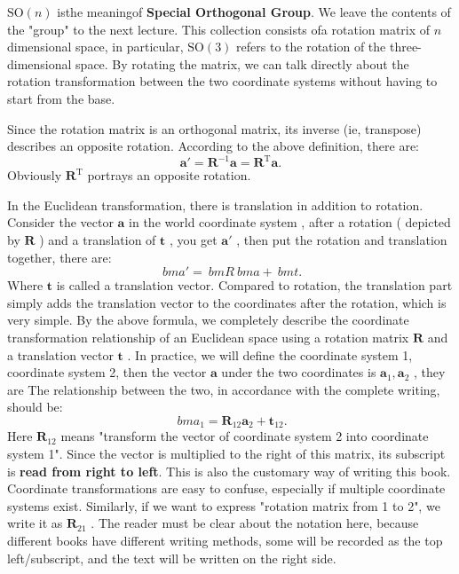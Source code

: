 $ \mathrm {SO}(n) $ isthe meaningof \textbf {Special Orthogonal Group}. We leave the contents of the "group" to the next lecture. This collection consists ofa rotation matrix of $ n $ dimensional space, in particular, $ \mathrm {SO}( 3 ) $ refers to the rotation of the three-dimensional space. By rotating the matrix, we can talk directly about the rotation transformation between the two coordinate systems without having to start from the base.

Since the rotation matrix is an orthogonal matrix, its inverse (ie, transpose) describes an opposite rotation. According to the above definition, there are:
\begin{equation}
\bm{a} '= \bm{R}^{-1} \bm{a} = \bm{R}^ \mathrm{T} \bm{a}.
\end{equation}
Obviously $ \bm{R}^\mathrm{T} $ portrays an opposite rotation.

In the Euclidean transformation, there is translation in addition to rotation. Consider the vector $ \bm{a} $ in the world coordinate system , after a rotation ( depicted by $ \bm{R} $ ) and a translation of $ \bm{t} $ , you get $ \bm{a}' $ , then put the rotation and translation together, there are:
\begin{equation}
\label{eq:RT}
\ bm {a} '= \ bm {R} \ bm {a} + \ bm {t}.
\end{equation}
Where $ \bm{t} $ is called a translation vector. Compared to rotation, the translation part simply adds the translation vector to the coordinates after the rotation, which is very simple. By the above formula, we completely describe the coordinate transformation relationship of an Euclidean space using a rotation matrix $ \bm{R} $ and a translation vector $ \bm{t} $ . In practice, we will define the coordinate system 1, coordinate system 2, then the vector $ \bm{a} $ under the two coordinates is $ \bm{a}_1 , \bm{a}_2 $ , they are The relationship between the two, in accordance with the complete writing, should be:
\begin{equation}
\ bm{a}_1 = \bm{R}_{12} \bm{a}_2 + \bm{t}_{12}.
\end{equation}
Here $ \bm{R}_{12} $ means "transform the vector of coordinate system 2 into coordinate system 1". Since the vector is multiplied to the right of this matrix, its subscript is \textbf{read from right to left}. This is also the customary way of writing this book. Coordinate transformations are easy to confuse, especially if multiple coordinate systems exist. Similarly, if we want to express "rotation matrix from 1 to 2", we write it as $ \bm{R}_{21} $ . The reader must be clear about the notation here, because different books have different writing methods, some will be recorded as the top left/subscript, and the text will be written on the right side.

